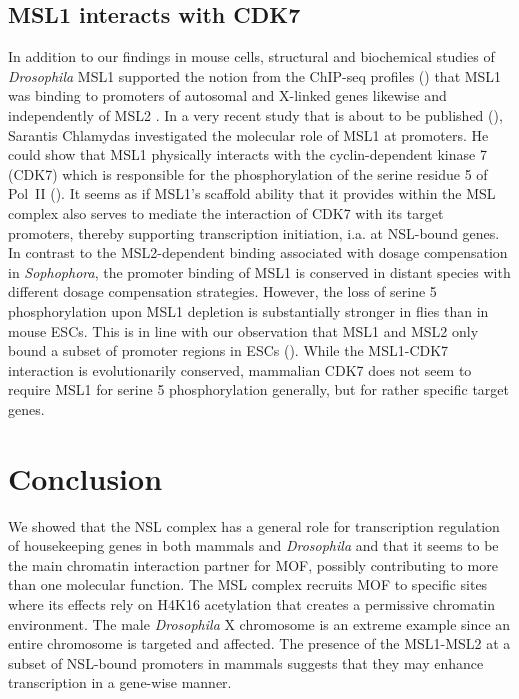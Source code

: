 \subsection{MSL1 interacts with CDK7}
%
In addition to our findings in mouse cells, structural and biochemical studies of \textit{Drosophila} MSL1 supported the notion from the ChIP-seq profiles () that MSL1 was binding to promoters of autosomal and X-linked genes likewise and independently of MSL2 \citep{Hallacli2012}. In a very recent study that is about to be published (), Sarantis Chlamydas investigated the molecular role of MSL1 at promoters. He could show that MSL1 physically interacts with the cyclin-dependent kinase 7 (CDK7) which is responsible for the phosphorylation of the serine residue 5 of Pol~II \citep{Sanso2013} (). It seems as if MSL1’s scaffold ability that it provides within the MSL complex also serves to mediate the interaction of CDK7 with its target promoters, thereby supporting transcription initiation, i.a. at NSL-bound genes. In contrast to the MSL2-dependent binding associated with dosage compensation in \textit{Sophophora}, the promoter binding of MSL1 is conserved in distant species with different dosage compensation strategies. However, the loss of serine 5 phosphorylation upon MSL1 depletion is substantially stronger in flies than in mouse ESCs. This is in line with our observation that MSL1 and MSL2 only bound a subset of promoter regions in ESCs (). While the MSL1-CDK7 interaction is evolutionarily conserved, mammalian CDK7 does not seem to require MSL1 for serine 5 phosphorylation generally, but for rather specific target genes.
\section{Conclusion}
We showed that the NSL complex has a general role for transcription regulation of housekeeping genes in both mammals and \textit{Drosophila} and that it seems to be the main chromatin interaction partner for MOF, possibly contributing to more than one molecular function. The MSL complex recruits MOF to specific sites where its effects rely on H4K16 acetylation that creates a permissive chromatin environment. The male \textit{Drosophila} X chromosome is an extreme example since an entire chromosome is targeted and affected. The presence of the MSL1-MSL2 at a subset of NSL-bound promoters in mammals suggests that they may enhance transcription in a gene-wise manner.

